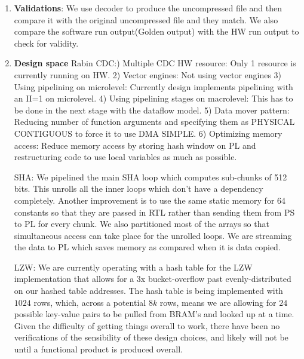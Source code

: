 \documentclass{article}
\begin{document}
\begin{enumerate}
\item%
\textbf{Validations}: We use decoder to produce the uncompressed file and then compare it with the original uncompressed file and they match. 
We also compare the software run output(Golden output) with the HW run output to check for validity. 
\newline

\item%
\textbf{Design space}\newline
Rabin CDC:) Multiple CDC HW resource: Only 1 resource is currently running on HW.
2) Vector engines: Not using vector engines
3) Using pipelining on microlevel: Currently design implements pipelining with an II=1 on microlevel. 
4) Using pipelining stages on macrolevel: This has to be done in the next stage with the dataflow model.
5) Data mover pattern: Reducing number of function arguments and specifying them as PHYSICAL CONTIGUOUS to force it to use DMA SIMPLE.
6) Optimizing memory access: Reduce memory access by storing hash window on PL and restructuring code to use local variables as much as possible. 

\newline
SHA:\newline
 We pipelined the main SHA loop which computes sub-chunks of 512 bits. This unrolls all the inner loops which don't have a dependency completely. 
 Another improvement is to use the same static memory for 64 constants so that they are passed in RTL rather than sending them from PS to PL for every chunk.
 We also partitioned most of the arrays so that simultaneous access can take place for the unrolled loops. 
 We are streaming the data to PL which saves memory as compared when it is data copied. 
\newline

LZW:\newline
We are currently operating with a hash table for the LZW implementation that allows for a 3x bucket-overflow past evenly-distributed on our hashed table addresses. The hash table is being implemented with $1024$ rows, which, across a potential $8k$ rows, means we are allowing for $24$ possible key-value pairs to be pulled from BRAM's and looked up at a time. 
Given the difficulty of getting things overall to work, there have been no verifications of the sensibility of these design choices, and likely will not be until a functional product is produced overall.

\newline


\end{enumerate}
\end{document}
